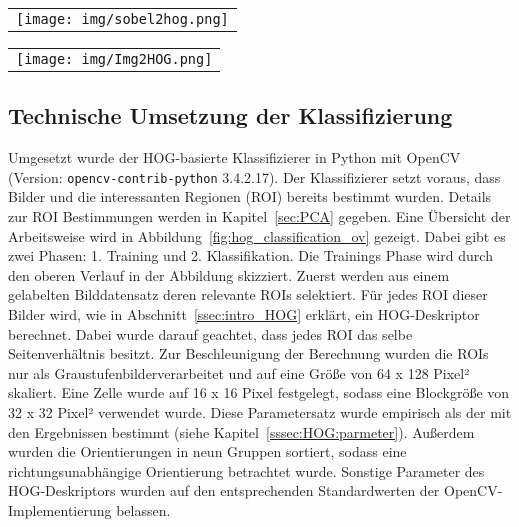 \begin{center}
\begin{tabular}{c}
\texttt{[image: img/sobel2hog.png]}
\end{tabular}
\label{fig:sobel2hog}
\end{center}

\begin{center}
\begin{tabular}{c}
\texttt{[image: img/Img2HOG.png]}
\end{tabular}
\label{fig:img2HOG}
\end{center}


\subsection{Technische Umsetzung der Klassifizierung} \label{ssec:implementation}
Umgesetzt wurde der HOG-basierte Klassifizierer in Python mit OpenCV (Version: \texttt{opencv-contrib-python} 3.4.2.17). Der Klassifizierer setzt voraus, dass Bilder und die interessanten Regionen (ROI) bereits bestimmt wurden. Details zur ROI Bestimmungen werden in Kapitel~\ref{sec:PCA} gegeben. Eine Übersicht der Arbeitsweise wird in Abbildung~\ref{fig:hog_classification_ov} gezeigt. Dabei gibt es zwei Phasen: 1. Training und 2. Klassifikation. Die Trainings Phase wird durch den oberen Verlauf in der Abbildung skizziert. Zuerst werden aus einem gelabelten Bilddatensatz deren relevante ROIs selektiert. Für jedes ROI dieser Bilder wird, wie in Abschnitt~\ref{ssec:intro_HOG} erklärt, ein HOG-Deskriptor berechnet. Dabei wurde darauf geachtet, dass jedes ROI das selbe Seitenverhältnis besitzt. Zur Beschleunigung der Berechnung wurden die ROIs nur als Graustufenbilderverarbeitet und auf eine Größe von 64 x 128 Pixel² skaliert. Eine Zelle wurde auf 16 x 16 Pixel festgelegt, sodass eine Blockgröße von 32 x 32 Pixel² verwendet wurde. Diese Parametersatz wurde empirisch als der mit den Ergebnissen bestimmt (siehe Kapitel~\ref{sssec:HOG:parmeter}). Außerdem wurden die Orientierungen in neun Gruppen sortiert, sodass eine richtungsunabhängige Orientierung betrachtet wurde. Sonstige Parameter des HOG-Deskriptors wurden auf den entsprechenden Standardwerten der OpenCV-Implementierung belassen.

